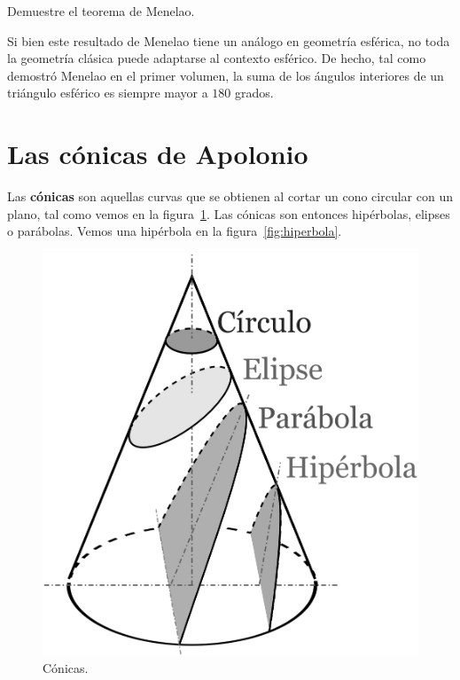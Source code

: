 \begin{exercise}
	Demuestre el teorema de Menelao.
\end{exercise}

Si bien este resultado de Menelao tiene un análogo en geometría esférica, no
toda la geometría clásica puede adaptarse al contexto esférico. De hecho, tal
como demostró Menelao en el primer volumen, la suma de los ángulos interiores
de un triángulo esférico es siempre mayor a $180$ grados. 

\section*{Las cónicas de Apolonio}

Las \textbf{cónicas} son aquellas curvas que se obtienen al cortar un cono
circular con un plano, tal como vemos en la figura~\ref{fig:conicas}. Las
cónicas son entonces hipérbolas, elipses o parábolas. Vemos una hipérbola en la
figura~\ref{fig:hiperbola}.

\begin{figure}[h]
   \centering
   \includegraphics[scale=0.05]{images/conicas}
   \caption{Cónicas.}
   \label{fig:conicas}
\end{figure}

